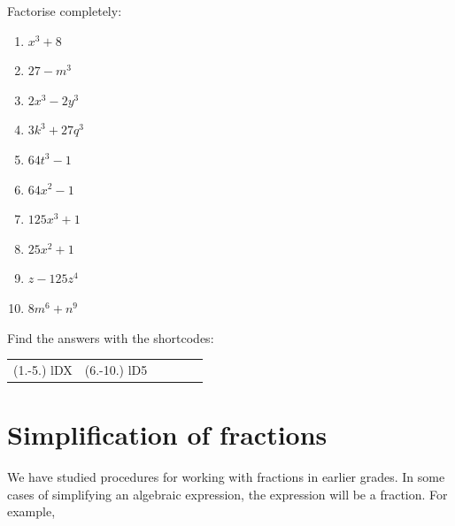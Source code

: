\begin{exercises}{}
{

Factorise completely:
\begin{multicols}{2}
\begin{enumerate}[itemsep=5pt, label=\textbf{\arabic*}. ] 
\item ${x}^{3}+8$
\item $27-m^{3}$
\item $2x^{3}-2y^{3}$
\item $3k^{3} + 27q^{3}$
\item $64t^{3}-1$
\item $64x^{2} -1$
\item $125x^{3} +1$
\item $25x^{2} +1$
\item $z-125z^4{}$
\item $8m^{6} + n^{9}$
\end{enumerate}
\end{multicols}
\practiceinfo 
\par {} Find the answers with the shortcodes:
 \par \begin{tabular}[h]{cccccc}
 (1.-5.) lDX   & (6.-10.) lD5 &  \end{tabular}
}
\end{exercises}

\section{Simplification of fractions}
We have studied procedures for working with fractions in earlier grades.
In some cases of simplifying an algebraic expression, the expression will be a fraction. For example, 

